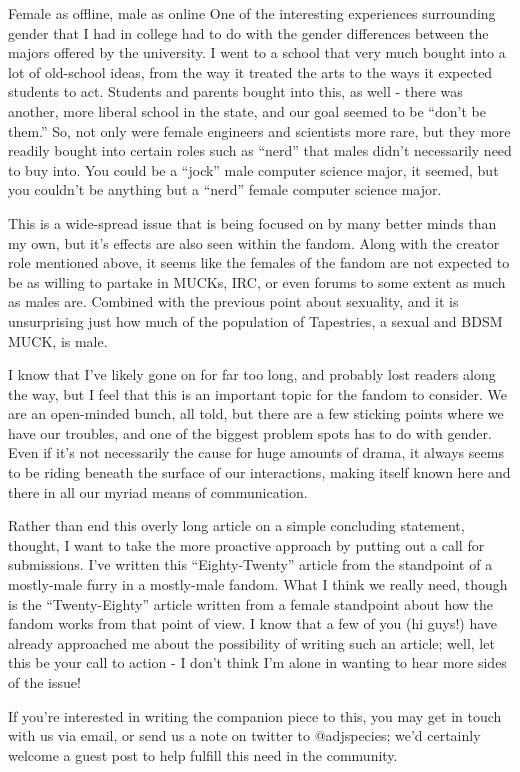 Female as offline, male as online One of the interesting experiences surrounding gender that I had in college had to do with the gender differences between the majors offered by the university. I went to a school that very much bought into a lot of old-school ideas, from the way it treated the arts to the ways it expected students to act. Students and parents bought into this, as well - there was another, more liberal school in the state, and our goal seemed to be ``don't be them.'' So, not only were female engineers and scientists more rare, but they more readily bought into certain roles such as ``nerd'' that males didn't necessarily need to buy into. You could be a ``jock'' male computer science major, it seemed, but you couldn't be anything but a ``nerd'' female computer science major.

This is a wide-spread issue that is being focused on by many better minds than my own, but it's effects are also seen within the fandom. Along with the creator role mentioned above, it seems like the females of the fandom are not expected to be as willing to partake in MUCKs, IRC, or even forums to some extent as much as males are. Combined with the previous point about sexuality, and it is unsurprising just how much of the population of Tapestries, a sexual and BDSM MUCK, is male.

I know that I've likely gone on for far too long, and probably lost readers along the way, but I feel that this is an important topic for the fandom to consider. We are an open-minded bunch, all told, but there are a few sticking points where we have our troubles, and one of the biggest problem spots has to do with gender. Even if it's not necessarily the cause for huge amounts of drama, it always seems to be riding beneath the surface of our interactions, making itself known here and there in all our myriad means of communication.

Rather than end this overly long article on a simple concluding statement, thought, I want to take the more proactive approach by putting out a call for submissions. I've written this ``Eighty-Twenty'' article from the standpoint of a mostly-male furry in a mostly-male fandom. What I think we really need, though is the ``Twenty-Eighty'' article written from a female standpoint about how the fandom works from that point of view. I know that a few of you (hi guys!) have already approached me about the possibility of writing such an article; well, let this be your call to action - I don't think I'm alone in wanting to hear more sides of the issue!

If you're interested in writing the companion piece to this, you may get in touch with us via email, or send us a note on twitter to @adjspecies; we'd certainly welcome a guest post to help fulfill this need in the community.
